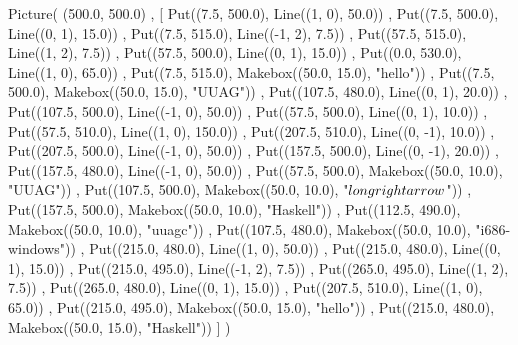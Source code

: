 Picture(
  (500.0, 500.0)
, [ Put((7.5, 500.0), Line((1, 0), 50.0))
  , Put((7.5, 500.0), Line((0, 1), 15.0))
  , Put((7.5, 515.0), Line((-1, 2), 7.5))
  , Put((57.5, 515.0), Line((1, 2), 7.5))
  , Put((57.5, 500.0), Line((0, 1), 15.0))
  , Put((0.0, 530.0), Line((1, 0), 65.0))
  , Put((7.5, 515.0), Makebox((50.0, 15.0), "hello"))
  , Put((7.5, 500.0), Makebox((50.0, 15.0), "UUAG"))
  , Put((107.5, 480.0), Line((0, 1), 20.0))
  , Put((107.5, 500.0), Line((-1, 0), 50.0))
  , Put((57.5, 500.0), Line((0, 1), 10.0))
  , Put((57.5, 510.0), Line((1, 0), 150.0))
  , Put((207.5, 510.0), Line((0, -1), 10.0))
  , Put((207.5, 500.0), Line((-1, 0), 50.0))
  , Put((157.5, 500.0), Line((0, -1), 20.0))
  , Put((157.5, 480.0), Line((-1, 0), 50.0))
  , Put((57.5, 500.0), Makebox((50.0, 10.0), "UUAG"))
  , Put((107.5, 500.0), Makebox((50.0, 10.0), "$\\longrightarrow$"))
  , Put((157.5, 500.0), Makebox((50.0, 10.0), "Haskell"))
  , Put((112.5, 490.0), Makebox((50.0, 10.0), "uuagc"))
  , Put((107.5, 480.0), Makebox((50.0, 10.0), "i686-windows"))
  , Put((215.0, 480.0), Line((1, 0), 50.0))
  , Put((215.0, 480.0), Line((0, 1), 15.0))
  , Put((215.0, 495.0), Line((-1, 2), 7.5))
  , Put((265.0, 495.0), Line((1, 2), 7.5))
  , Put((265.0, 480.0), Line((0, 1), 15.0))
  , Put((207.5, 510.0), Line((1, 0), 65.0))
  , Put((215.0, 495.0), Makebox((50.0, 15.0), "hello"))
  , Put((215.0, 480.0), Makebox((50.0, 15.0), "Haskell"))
  ]
)
